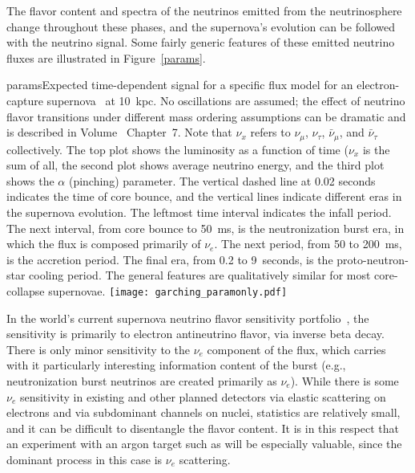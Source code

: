The flavor content and spectra of the neutrinos emitted from the neutrinosphere change
throughout these phases, and the supernova's evolution can
be followed with the neutrino signal. 
Some fairly generic features of these emitted neutrino fluxes are
illustrated in Figure~\ref{params}.

\begin{dunefigure}{params}{Expected
  time-dependent signal for a specific flux model for an
  electron-capture supernova~\cite{Huedepohl:2009wh} at 10~kpc.  No oscillations are assumed; the effect of neutrino flavor transitions under different mass ordering assumptions can be dramatic and is described in Volume~\volnumberphysics{} Chapter~7. 
  Note that $\nu_x$  refers to $\nu_\mu$,
$\nu_\tau$, $\bar{\nu}_\mu$, and $\bar{\nu}_{\tau}$ collectively. The
  top plot shows the luminosity as a function of time ($\nu_x$ is the sum of all, the second plot
  shows average neutrino energy, and the third plot shows the $\alpha$
  (pinching) parameter.  The vertical dashed line at 0.02 seconds indicates
  the time of core bounce, and the vertical lines indicate different
  eras in the supernova evolution.  The leftmost time interval
  indicates the infall period.  The next interval, from core bounce to
  50~ms, is the neutronization burst era, in which the flux is
  composed primarily of $\nu_e$.  The next period, from 50 to 200~ms,
  is the accretion period. The final era, from 0.2 to 9~seconds, is
  the proto-neutron-star cooling period.  The general features are
  qualitatively similar for most core-collapse supernovae.}
\texttt{[image: garching\_paramonly.pdf]}
\end{dunefigure}

In the world's current supernova neutrino flavor sensitivity
portfolio~\cite{Scholberg:2012id, Mirizzi:2015eza}, the sensitivity 
is primarily to electron antineutrino flavor, via inverse beta decay.  
There is only minor sensitivity to the $\nu_e$
component of the flux, which carries with it particularly interesting 
information content of the burst (e.g., neutronization burst neutrinos
are created primarily as $\nu_e$).  While there is some $\nu_e$
sensitivity in existing and other planned detectors via elastic 
scattering on electrons and via subdominant channels on nuclei, 
statistics are relatively small,
and it can be difficult to disentangle the flavor content.  It is 
in this respect that an experiment with an argon target such as  
will be especially valuable, since the dominant process in 
this case is $\nu_e$  scattering.


